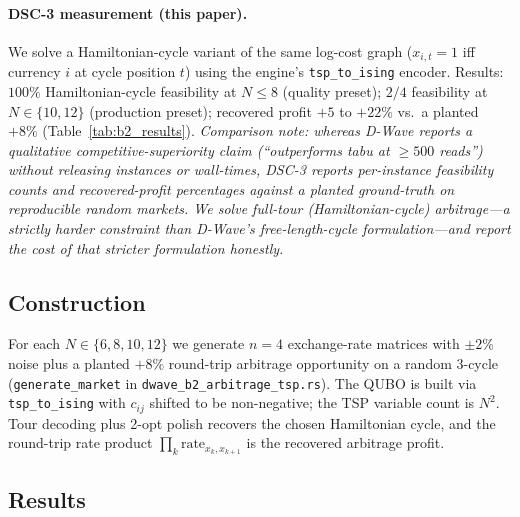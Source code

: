 \documentclass[11pt,a4paper]{article}
\begin{document}
\paragraph{DSC-3 measurement (this paper).}
We solve a Hamiltonian-cycle variant of the same log-cost graph
($x_{i,t}\!=\!1$ iff currency $i$ at cycle position $t$) using the
engine's \texttt{tsp\_to\_ising} encoder. Results:
$100\%$ Hamiltonian-cycle feasibility at $N\!\le\!8$ (quality preset);
$2/4$ feasibility at $N\!\in\!\{10, 12\}$ (production preset);
recovered profit $+5$ to $+22\%$ vs.\ a planted $+8\%$
(Table~\ref{tab:b2_results}). \emph{Comparison note: whereas D-Wave
reports a qualitative competitive-superiority claim (``outperforms
tabu at $\ge\!500$ reads'') without releasing instances or wall-times,
DSC-3 reports per-instance feasibility counts and recovered-profit
percentages against a planted ground-truth on reproducible random
markets. We solve full-tour (Hamiltonian-cycle) arbitrage---a strictly
harder constraint than D-Wave's free-length-cycle formulation---and
report the cost of that stricter formulation honestly.}

\subsection{Construction}

For each $N\!\in\!\{6, 8, 10, 12\}$ we generate $n\!=\!4$ exchange-rate
matrices with $\pm 2\%$ noise plus a planted $+8\%$ round-trip
arbitrage opportunity on a random 3-cycle (\texttt{generate\_market} in
\texttt{dwave\_b2\_arbitrage\_tsp.rs}). The QUBO is built via
\texttt{tsp\_to\_ising} with $c_{ij}$ shifted to be non-negative; the
TSP variable count is $N^2$. Tour decoding plus 2-opt polish recovers
the chosen Hamiltonian cycle, and the round-trip rate product
$\prod_k \text{rate}_{x_k, x_{k+1}}$ is the recovered arbitrage profit.

\subsection{Results}
\end{document}
